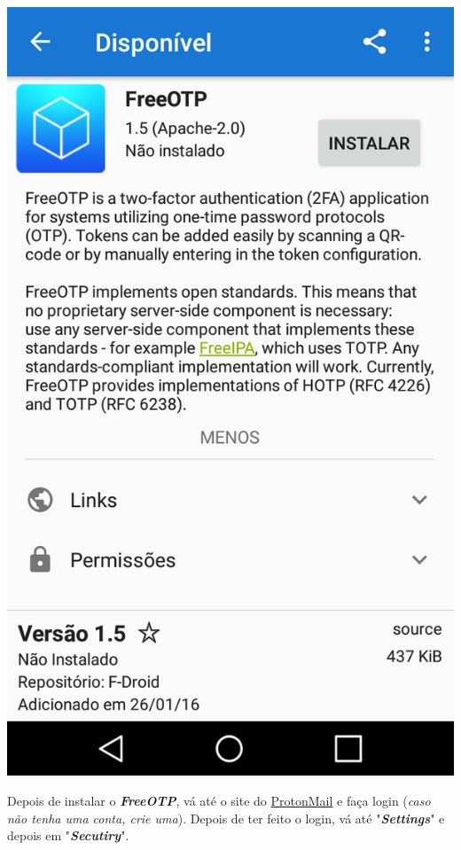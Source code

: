 \documentclass[12pt, letterpaper, Monospace:12]{report}
\begin{document}
	\begin{center}
		\includegraphics[scale=0.35]{FreeOTP-Fdroid.png}
	\end{center}

	Depois de instalar o \textit{\textbf{FreeOTP}}, vá até o site do \href{https://protonmail.com}{ProtonMail} e faça login (\textit{caso não tenha uma conta, crie uma}). Depois de ter feito o login, vá até "\textit{\textbf{Settings}}" e depois em "\textit{\textbf{Secutiry}}".
\end{document}

